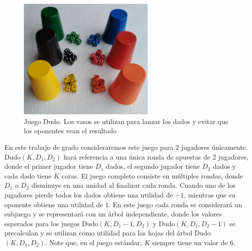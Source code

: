 \begin{figure}
\caption[Juego Dudo]{Juego Dudo. Los vasos se utilizan para lanzar los dados y evitar que los oponentes vean el resultado}
\label{fig:dudo}
\centering
\includegraphics[width=0.6\textwidth]{figuras/dudo.jpg}
\end{figure}

En este trabajo de grado consideraremos este juego para $2$ jugadores únicamente. Dudo$(K, D_1, D_2)$ hará referencia a una única ronda de apuestas de $2$ jugadores, donde el primer jugador tiene $D_1$ dados, el segundo jugador tiene $D_2$ dados y cada dado tiene $K$ caras. El juego completo consiste en múltiples rondas, donde $D_1$ o $D_2$ disminuye en una unidad al finalizar cada ronda. Cuando uno de los jugadores pierde todos los dados obtiene una utilidad de $-1$, mientras que su oponente obtiene una utilidad de $1$. En este juego cada ronda se considerará un subjuego y se representará con un árbol independiente, donde los valores esperados para los juegos Dudo$(K, D_1 - 1, D_2)$ y Dudo$(K, D_1, D_2 - 1)$ se precalculan y se utilizan como utilidad para las hojas del árbol Dudo$(K, D_1, D_2)$. Note que, en el juego estándar, $K$ siempre tiene un valor de $6$.

